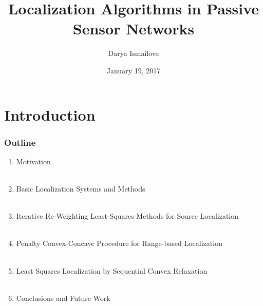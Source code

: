 \documentclass [t] {beamer} %
\title[Localization in PSN]{Localization Algorithms in Passive Sensor Networks}
\author{Darya Ismailova}
\institute[UVic] 
{
Department of Electrical and Computer Engineering \\
University of Victoria, Victoria, BC, Canada \\
\medskip
}
\date{January 19, 2017}
\begin{document}
 

\begin{frame} %
\titlepage 
\end{frame}




\section{Introduction} 

\begin{frame} %
\frametitle{Outline} 
\begin{enumerate}
\item
Motivation
\\~\\
\item
Basic Localization Systems and Methods
\\~\\
\item
Iterative Re-Weighting Least-Squares Methods for Source Localization
\\~\\
\item
Penalty Convex-Concave Procedure for Range-based Localization
\\~\\
\item
Least Squares Localization by Sequential Convex Relaxation
\\~\\
\item
Conclusions and Future Work
\end{enumerate}
\end{frame}
\end{document}
